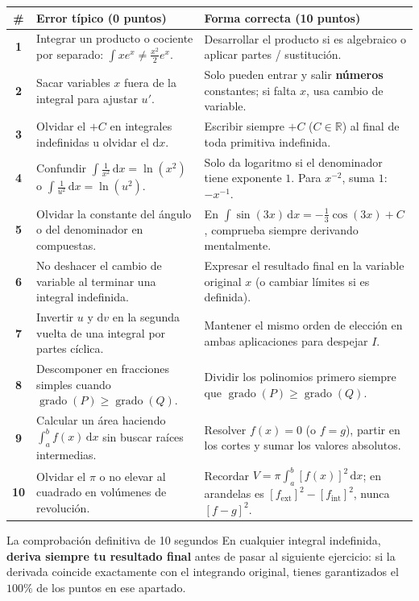 \documentclass[10pt,a4paper]{article}
\begin{document}
\begin{center}
\renewcommand{\arraystretch}{1.12}
\footnotesize
\begin{tabularx}{\linewidth}{@{}c X X@{}}
\toprule
\textbf{\#} & \textbf{Error típico (0 puntos)} & \textbf{Forma correcta (10 puntos)} \\
\midrule
\textbf{1} & Integrar un producto o cociente por separado: $\int x e^x \neq \frac{x^2}{2} e^x$. & Desarrollar el producto si es algebraico o aplicar partes / sustitución. \\
\textbf{2} & Sacar variables $x$ fuera de la integral para ajustar $u'$. & Solo pueden entrar y salir \textbf{números} constantes; si falta $x$, usa cambio de variable. \\
\textbf{3} & Olvidar el $+C$ en integrales indefinidas u olvidar el $\mathrm{d}x$. & Escribir siempre $+C$ ($C \in \mathbb{R}$) al final de toda primitiva indefinida. \\
\textbf{4} & Confundir $\int \frac{1}{x^2}\,\mathrm{d}x = \ln(x^2)$ o $\int \frac{1}{u^2}\,\mathrm{d}x = \ln(u^2)$. & Solo da logaritmo si el denominador tiene exponente $1$. Para $x^{-2}$, suma $1$: $-x^{-1}$. \\
\textbf{5} & Olvidar la constante del ángulo o del denominador en compuestas. & En $\int \sin(3x)\,\mathrm{d}x = -\frac{1}{3}\cos(3x)+C$, comprueba siempre derivando mentalmente. \\
\textbf{6} & No deshacer el cambio de variable al terminar una integral indefinida. & Expresar el resultado final en la variable original $x$ (o cambiar límites si es definida). \\
\textbf{7} & Invertir $u$ y $\mathrm{d}v$ en la segunda vuelta de una integral por partes cíclica. & Mantener el mismo orden de elección en ambas aplicaciones para despejar $I$. \\
\textbf{8} & Descomponer en fracciones simples cuando $\operatorname{grado}(P) \ge \operatorname{grado}(Q)$. & Dividir los polinomios primero siempre que $\operatorname{grado}(P) \ge \operatorname{grado}(Q)$. \\
\textbf{9} & Calcular un área haciendo $\int_a^b f(x)\,\mathrm{d}x$ sin buscar raíces intermedias. & Resolver $f(x)=0$ (o $f=g$), partir en los cortes y sumar los valores absolutos. \\
\textbf{10} & Olvidar el $\pi$ o no elevar al cuadrado en volúmenes de revolución. & Recordar $V = \pi \int_a^b [f(x)]^2\,\mathrm{d}x$; en arandelas es $[f_{\text{ext}}]^2 - [f_{\text{int}}]^2$, nunca $[f-g]^2$. \\
\bottomrule
\end{tabularx}
\end{center}

\begin{trucobox}{La comprobación definitiva de 10 segundos}
En cualquier integral indefinida, \textbf{deriva siempre tu resultado final} antes de pasar al siguiente ejercicio: si la derivada coincide exactamente con el integrando original, tienes garantizados el $100\%$ de los puntos en ese apartado.
\end{trucobox}
\end{document}
